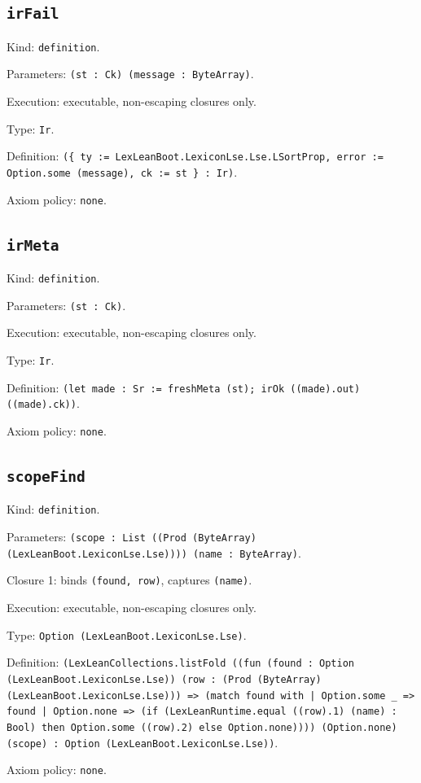 \documentclass[11pt]{article}
\begin{document}
\subsection*{\texttt{irFail}}
\noindent Kind: \texttt{definition}.\par
\noindent Parameters: \texttt{(st : Ck) (message : ByteArray)}.\par
\noindent Execution: executable, non-escaping closures only.\par
\noindent Type: \texttt{Ir}.\par
\noindent Definition: \texttt{(\{ ty := LexLeanBoot.LexiconLse.Lse.LSortProp, error := Option.some (message), ck := st \} : Ir)}.\par
\noindent Axiom policy: \texttt{none}.\par
\subsection*{\texttt{irMeta}}
\noindent Kind: \texttt{definition}.\par
\noindent Parameters: \texttt{(st : Ck)}.\par
\noindent Execution: executable, non-escaping closures only.\par
\noindent Type: \texttt{Ir}.\par
\noindent Definition: \texttt{(let made : Sr := freshMeta (st); irOk ((made).out) ((made).ck))}.\par
\noindent Axiom policy: \texttt{none}.\par
\subsection*{\texttt{scopeFind}}
\noindent Kind: \texttt{definition}.\par
\noindent Parameters: \texttt{(scope : List ((Prod (ByteArray) (LexLeanBoot.LexiconLse.Lse)))) (name : ByteArray)}.\par
\noindent Closure 1: binds \texttt{(found, row)}, captures \texttt{(name)}.\par
\noindent Execution: executable, non-escaping closures only.\par
\noindent Type: \texttt{Option (LexLeanBoot.LexiconLse.Lse)}.\par
\noindent Definition: \texttt{(LexLeanCollections.listFold ((fun (found : Option (LexLeanBoot.LexiconLse.Lse)) (row : (Prod (ByteArray) (LexLeanBoot.LexiconLse.Lse))) => (match found with | Option.some \_ => found | Option.none => (if (LexLeanRuntime.equal ((row).1) (name) : Bool) then Option.some ((row).2) else Option.none)))) (Option.none) (scope) : Option (LexLeanBoot.LexiconLse.Lse))}.\par
\noindent Axiom policy: \texttt{none}.\par
\end{document}
